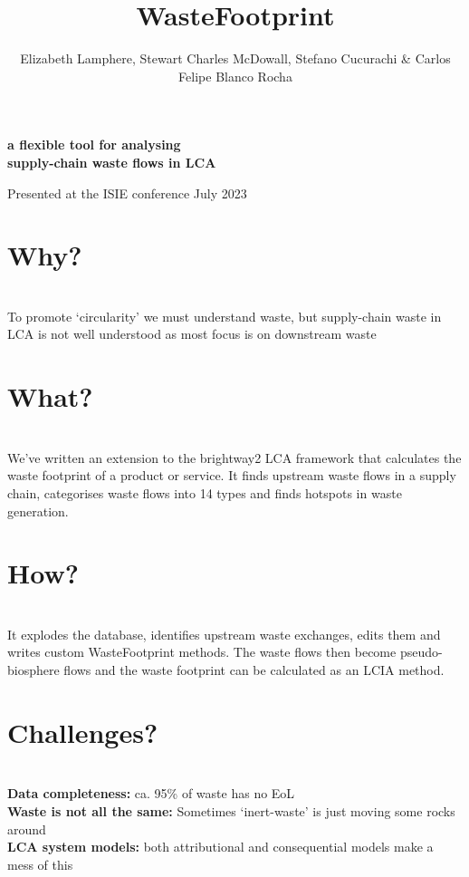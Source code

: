 \documentclass[a0paper,fleqn]{betterposter}
\begin{document}
{{    }{
    }
    }{

    \title{WasteFootprint}
    {\selectfont\textbf{a flexible tool for analysing\\ supply-chain waste flows in LCA}}\\

    \author{Elizabeth Lamphere, Stewart Charles McDowall, Stefano Cucurachi \& Carlos Felipe Blanco Rocha}
    \vspace{20pt}
    {\fontsize{30}{30}\selectfont Presented at the ISIE conference July 2023}

    \section{Why?}\\
    To promote `circularity' we must understand waste, but supply-chain waste in LCA is not well understood as most focus is on downstream waste

    \section{What?}\\
    We've written an extension to the brightway2 LCA framework that calculates the waste footprint of a product or service.
    It finds upstream waste flows in a supply chain, categorises waste flows into 14 types and finds hotspots in waste generation.

    \section{How?}\\
It explodes the database, identifies upstream waste exchanges, edits them and writes custom WasteFootprint methods. The waste flows then become pseudo-biosphere flows and the waste footprint can be calculated as an LCIA method.

    \section{Challenges?}\\
\textbf{Data completeness:} ca. 95\% of waste has no EoL\\
\textbf{Waste is not all the same:} Sometimes `inert-waste' is just moving some rocks around\\
 \textbf{LCA system models:} both attributional and consequential models make a mess of this

}
\end{document}
